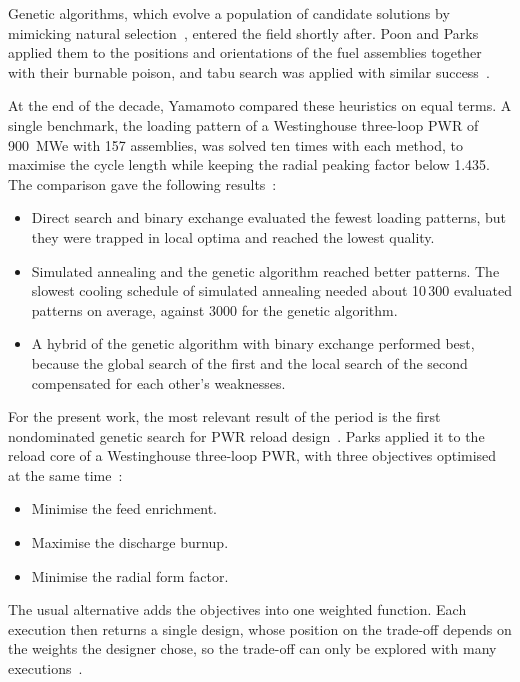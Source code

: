 Genetic algorithms, which evolve a population of candidate solutions by
mimicking natural selection~\cite{deb_2001}, entered the field shortly
after. Poon and Parks applied them to the positions and orientations of
the fuel assemblies together with their burnable poison, and tabu search
was applied with similar success~\cite{meneses_2010}.

At the end of the decade, Yamamoto compared these heuristics on equal
terms. A single benchmark, the loading pattern of a Westinghouse
three-loop PWR of 900~MWe with 157 assemblies, was solved ten times with
each method, to maximise the cycle length while keeping
the radial peaking factor below 1.435. The comparison gave the following
results~\cite{yamamoto_1997}:

\begin{itemize}
  \item Direct search and binary exchange evaluated the fewest loading
        patterns, but they were trapped in local optima and reached the
        lowest quality.

  \item Simulated annealing and the genetic algorithm reached better
        patterns. The slowest cooling schedule of simulated annealing
        needed about 10\,300 evaluated patterns on average, against 3000
        for the genetic algorithm.

  \item A hybrid of the genetic algorithm with binary exchange performed
        best, because the global search of the first and the local search
        of the second compensated for each other's weaknesses.
\end{itemize}

For the present work, the most relevant result of the period is the
first nondominated genetic search for PWR reload
design~\cite{parks_1996}. Parks applied it to the reload core of a
Westinghouse three-loop PWR, with three objectives optimised at the same
time~\cite{parks_1996}:

\begin{itemize}
  \item Minimise the feed enrichment.

  \item Maximise the discharge burnup.

  \item Minimise the radial form factor.
\end{itemize}

The usual alternative adds the objectives into one weighted function.
Each execution then returns a single design, whose position on the trade-off
depends on the weights the designer chose, so the trade-off can only be
explored with many executions~\cite{parks_1996}.

